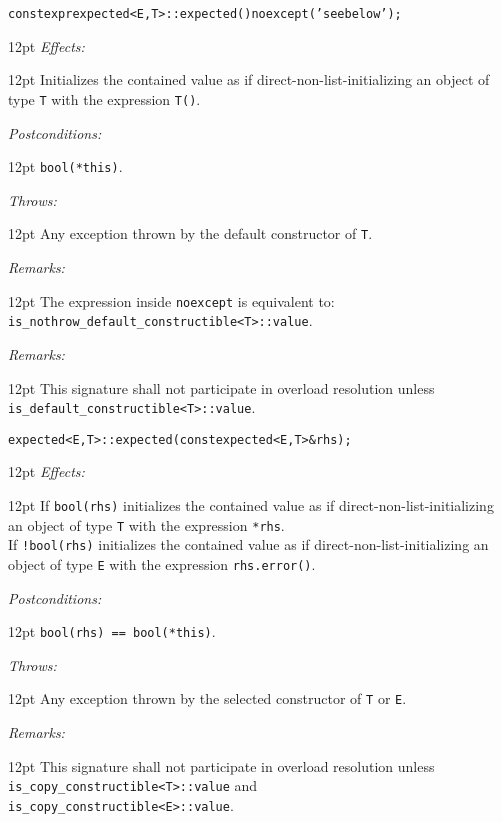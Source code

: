 \documentclass[a4paper,10pt]{article}
\newcommand{\cpp}[1]{\lstinline{#1}}
\newcommand{\wordingItem}[1]{\noindent\textit{#1:}}
\newenvironment{wordingTextItem}[1]{\wordingItem{#1}\vspace{2pt}\noindent\begin{adjustwidth}{12pt}{}}{\vspace{2pt}\end{adjustwidth}}
\newenvironment{wordingPara}{\begin{adjustwidth}{12pt}{}}{\end{adjustwidth}}
\newcommand{\suppress}[1]{\colorbox{suppress_color}{#1}}
\begin{document}
\begin{alltt}
constexpr \suppress{expected<E,T>::}expected() noexcept('see below');
\end{alltt}
\begin{wordingPara}
\begin{wordingTextItem}{Effects}
Initializes the contained value as if direct-non-list-initializing an object of type \cpp{T} with the expression \cpp{T()}.
\end{wordingTextItem}
\begin{wordingTextItem}{Postconditions}
\cpp{bool(*this)}.
\end{wordingTextItem}
\begin{wordingTextItem}{Throws}
Any exception thrown by the default constructor of \cpp{T}.
\end{wordingTextItem}
\begin{wordingTextItem}{Remarks}
The expression inside \cpp{noexcept} is equivalent to:\\
\cpp{is_nothrow_default_constructible<T>::value}.
\end{wordingTextItem}
\begin{wordingTextItem}{Remarks}
This signature shall not participate in overload resolution unless\\
 \cpp{is_default_constructible<T>::value}.
\end{wordingTextItem}


\end{wordingPara}

\begin{alltt}
\suppress{expected<E,T>::}expected(const expected\suppress{<E,T>}& rhs);
\end{alltt}
\begin{wordingPara}
\begin{wordingTextItem}{Effects}
If \cpp{bool(rhs)} initializes the contained value as if direct-non-list-initializing an object of type \cpp{T} with the expression \cpp{*rhs}.\\

\noindent
If \cpp{!bool(rhs)} initializes the contained value as if direct-non-list-initializing an object of type \cpp{E} with the expression \cpp{rhs.error()}.
\end{wordingTextItem}
\begin{wordingTextItem}{Postconditions}
\cpp{bool(rhs) == bool(*this)}.
\end{wordingTextItem}
\begin{wordingTextItem}{Throws}
Any exception thrown by the selected constructor of \cpp{T} or \cpp{E}.
\end{wordingTextItem}
\begin{wordingTextItem}{Remarks}
This signature shall not participate in overload resolution unless\\
\cpp{is_copy_constructible<T>::value} and\\
\cpp{is_copy_constructible<E>::value}.
\end{wordingTextItem}
\end{wordingPara}
\end{document}
